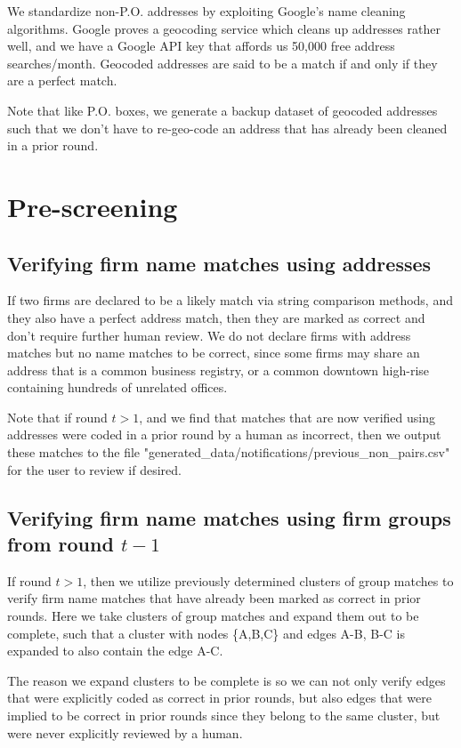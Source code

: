 \documentclass{article}
\begin{document}
We standardize non-P.O. addresses by exploiting Google's name cleaning algorithms. Google proves a geocoding service which cleans up addresses rather well, and we have a Google API key that affords us 50,000 free address searches/month. Geocoded addresses are said to be a match if and only if they are a perfect match. 

Note that like P.O. boxes, we generate a backup dataset of geocoded addresses such that we don't have to re-geo-code an address that has already been cleaned in a prior round. 

\section{Pre-screening}

\subsection{Verifying firm name matches using addresses}

If two firms are declared to be a likely match via string comparison methods, and they also have a perfect address match, then they are marked as correct and don't require further human review. We do not declare firms with address matches but no name matches to be correct, since some firms may share an address that is a common business registry, or a common downtown high-rise containing hundreds of unrelated offices. 

Note that if round $t > 1$, and we find that matches that are now verified using addresses were coded in a prior round by a human as incorrect, then we output these matches to the file "generated\_data/notifications/previous\_non\_pairs.csv" for the user to review if desired. 

\subsection{Verifying firm name matches using firm groups from round $t - 1$}

If round $t > 1$, then we utilize previously determined clusters of group matches to verify firm name matches that have already been marked as correct in prior rounds. Here we take clusters of group matches and expand them out to be complete, such that a cluster with nodes \{A,B,C\} and edges A-B, B-C is expanded to also contain the edge A-C. 

The reason we expand clusters to be complete is so we can not only verify edges that were explicitly coded as correct in prior rounds, but also edges that were implied to be correct in prior rounds since they belong to the same cluster, but were never explicitly reviewed by a human. 
\end{document}
